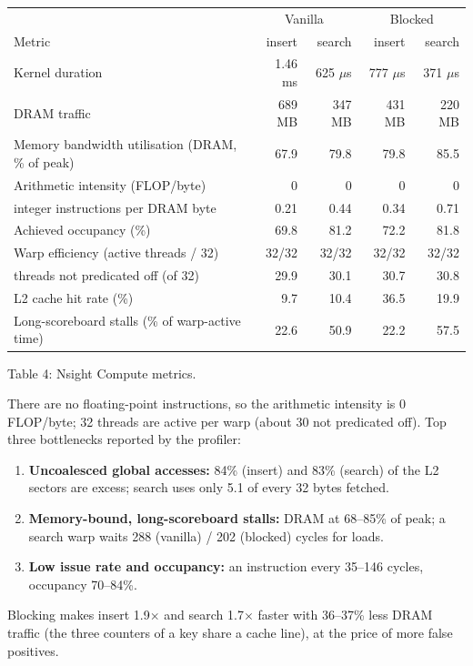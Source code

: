 \documentclass[11pt]{article}
\begin{document}
\begin{center}
\small
\begin{tabular}{lrrrr}
\toprule
 & \multicolumn{2}{c}{Vanilla} & \multicolumn{2}{c}{Blocked} \\
Metric & insert & search & insert & search \\
\midrule
Kernel duration & 1.46 ms & 625 $\mu$s & 777 $\mu$s & 371 $\mu$s \\
DRAM traffic & 689 MB & 347 MB & 431 MB & 220 MB \\
Memory bandwidth utilisation (DRAM, \% of peak) & 67.9 & 79.8 & 79.8 & 85.5 \\
Arithmetic intensity (FLOP/byte) & 0 & 0 & 0 & 0 \\
\quad integer instructions per DRAM byte & 0.21 & 0.44 & 0.34 & 0.71 \\
Achieved occupancy (\%) & 69.8 & 81.2 & 72.2 & 81.8 \\
Warp efficiency (active threads / 32) & 32/32 & 32/32 & 32/32 & 32/32 \\
\quad threads not predicated off (of 32) & 29.9 & 30.1 & 30.7 & 30.8 \\
L2 cache hit rate (\%) & 9.7 & 10.4 & 36.5 & 19.9 \\
Long-scoreboard stalls (\% of warp-active time) & 22.6 & 50.9 & 22.2 & 57.5 \\
\bottomrule
\end{tabular}

\smallskip
Table 4: Nsight Compute metrics.
\end{center}

There are no floating-point instructions, so the arithmetic intensity is 0
FLOP/byte; 32 threads are active per warp (about 30 not predicated off). Top
three bottlenecks reported by the profiler:
\begin{enumerate}
\item \textbf{Uncoalesced global accesses:} 84\% (insert) and 83\% (search) of the L2
 sectors are excess; search uses only 5.1 of every 32 bytes fetched.
\item \textbf{Memory-bound, long-scoreboard stalls:} DRAM at 68--85\% of peak; a search
 warp waits 288 (vanilla) / 202 (blocked) cycles for loads.
\item \textbf{Low issue rate and occupancy:} an instruction every 35--146 cycles,
 occupancy 70--84\%.
\end{enumerate}
Blocking makes insert 1.9$\times$ and search 1.7$\times$ faster with 36--37\% less
DRAM traffic (the three counters of a key share a cache line), at the price of
more false positives.
\end{document}

